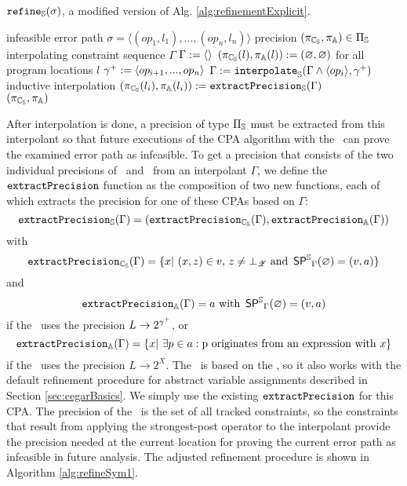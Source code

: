 \begin{algorithm}[t]
\caption{$\texttt{refine}_{\mathbb{S}}(\sigma)$, a modified version of Alg. \ref{alg:refinementExplicit}.}
\label{alg:refineSym1}
\begin{algorithmic}[1]
\Input infeasible error path $\sigma = \langle (op_1, l_1), ..., (op_n, l_n) \rangle$
\Output precision $(\pi_{\mathbb{C_{S}}}, \pi_{\mathbb{A}}) \in \Pi_{\mathbb{S}}$
\Variables interpolating constraint sequence $\Gamma$
\State $\Gamma := \langle \rangle$
\State $(\pi_{\mathbb{C_{S}}}(l), \pi_{\mathbb{A}}(l)) := (\varnothing, \varnothing)$ for all program locations $l$
	\State ${\gamma^{+}} := \langle op_{i+1}, ..., op_n \rangle$
	\State $\Gamma := \texttt{interpolate}_{\mathbb{S}}(\Gamma \wedge \langle op_i \rangle, {\gamma^{+}})$ \Comment inductive interpolation \label{alg:refinementExplicit:interpolation}
	\State $(\pi_{\mathbb{C_{S}}}(l_i), \pi_{\mathbb{A}}(l_i)) := \texttt{extractPrecision}_{\mathbb{S}}(\Gamma)$
\EndFor\\
\Return $(\pi_{\mathbb{C_{S}}}, \pi_{\mathbb{A}})$
\end{algorithmic}
\end{algorithm}

After interpolation is done, a precision of type $\Pi_{\mathbb{S}}$ must be extracted from this interpolant so that future executions of the CPA algorithm with the \symbolicExecutionCPA\ can prove the examined error path as infeasible.
To get a precision that consists of the two individual precisions of \symbolicValueAnalysisCPA\ and \constraintsCPA\ from an interpolant $\Gamma$, we define the $\texttt{extractPrecision}$ function as the composition of two new functions, each of which extracts the precision for one of these CPAs based on $\Gamma$:
\[\texttt{extractPrecision}_{\mathbb{S}}(\Gamma) = (\texttt{extractPrecision}_{\mathbb{C_{S}}}(\Gamma), \texttt{extractPrecision}_{\mathbb{A}}(\Gamma))\]
with
\[\texttt{extractPrecision}_{\mathbb{C_{S}}}(\Gamma) = \{ x |\ (x, z) \in v \text{, } z \neq \bot_{\mathscr{Z}} \text{ and } \operatorname{\operatorname{\operatorname{\mathsf{SP}}}^{\mathbb{S}}}_\Gamma (\varnothing) = (v, a) \}\]
and
\[\texttt{extractPrecision}_{\mathbb{A}}(\Gamma)  = a \text{ with } \operatorname{\operatorname{\operatorname{\mathsf{SP}}}^{\mathbb{S}}}_\Gamma (\varnothing) = (v, a)\]
if the \constraintsCPA\ uses the precision $L \rightarrow 2^{\gamma^+}$, or
\[\extractPrecisionConstrAlt{\Gamma} = \{ x |\ \exists p \in a : \text{p originates from an expression with $x$} \}\]
if the \constraintsCPA\ uses the precision $L \rightarrow 2^X$.
The \symbolicValueAnalysisCPA\ is based on the , so it also works with the default refinement procedure for abstract variable assignments described in Section \ref{sec:cegarBasics}.
We simply use the existing $\texttt{extractPrecision}$ for this CPA.
The precision of the \constraintsCPA\ is the set of all tracked constraints, so the constraints that result from applying the strongest-post operator to the interpolant provide the precision needed at the current location for proving the current error path as infeasible in future analysis.
The adjusted refinement procedure is shown in Algorithm \ref{alg:refineSym1}.

